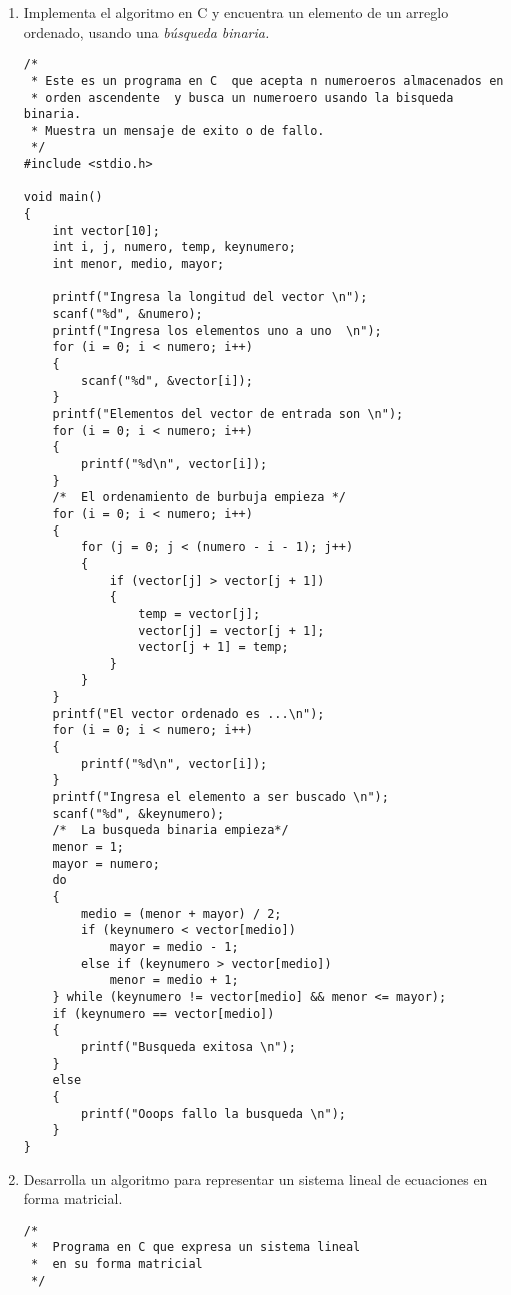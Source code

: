 \documentclass[twoside,10.5pt]{article}%
\begin{document}
\begin{enumerate}
\begin{verbatim}
   printf("Despues del ordenamiento:\n ");
   for (i = 0; i < numero; i++) {
      printf("%d \n", vector[i]);
   }

   return 0;
}
\end{verbatim} 

\item \mbox{Implementa} el \mbox{algoritmo} en C y encuentra un elemento de un arreglo ordenado, usando una \textit{b\'usqueda \mbox{binaria}.}


\begin{verbatim}
/*
 * Este es un programa en C  que acepta n numeroeros almacenados en  
 * orden ascendente  y busca un numeroero usando la bisqueda binaria.
 * Muestra un mensaje de exito o de fallo.
 */
#include <stdio.h>
 
void main()
{
    int vector[10];
    int i, j, numero, temp, keynumero;
    int menor, medio, mayor;
 
    printf("Ingresa la longitud del vector \n");
    scanf("%d", &numero);
    printf("Ingresa los elementos uno a uno  \n");
    for (i = 0; i < numero; i++)
    {
        scanf("%d", &vector[i]);
    }
    printf("Elementos del vector de entrada son \n");
    for (i = 0; i < numero; i++)
    {
        printf("%d\n", vector[i]);
    }
    /*  El ordenamiento de burbuja empieza */
    for (i = 0; i < numero; i++)
    {
        for (j = 0; j < (numero - i - 1); j++)
        {
            if (vector[j] > vector[j + 1])
            {
                temp = vector[j];
                vector[j] = vector[j + 1];
                vector[j + 1] = temp;
            }
        }
    }
    printf("El vector ordenado es ...\n");
    for (i = 0; i < numero; i++)
    {
        printf("%d\n", vector[i]);
    }
    printf("Ingresa el elemento a ser buscado \n");
    scanf("%d", &keynumero);
    /*  La busqueda binaria empieza*/
    menor = 1;
    mayor = numero;
    do
    {
        medio = (menor + mayor) / 2;
        if (keynumero < vector[medio])
            mayor = medio - 1;
        else if (keynumero > vector[medio])
            menor = medio + 1;
    } while (keynumero != vector[medio] && menor <= mayor);
    if (keynumero == vector[medio])
    {
        printf("Busqueda exitosa \n");
    }
    else
    {
        printf("Ooops fallo la busqueda \n");
    }
}
\end{verbatim}


\item Desarrolla un algoritmo para representar un sistema lineal de ecuaciones en forma matricial.

\begin{verbatim}
/*
 *  Programa en C que expresa un sistema lineal
 *  en su forma matricial 
 */


\end{verbatim}
\end{enumerate}
\end{document}
